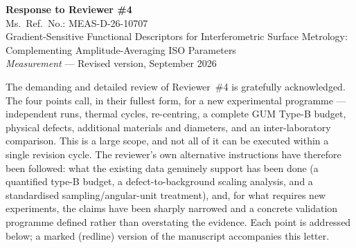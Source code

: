\documentclass[11pt,a4paper]{article}
\begin{document}
\begin{center}
{\Large\bfseries Response to Reviewer \#4}\\[0.4em]
{\large Ms.\ Ref.\ No.: MEAS-D-26-10707}\\[0.3em]
Gradient-Sensitive Functional Descriptors for Interferometric Surface Metrology:\\
Complementing Amplitude-Averaging ISO Parameters\\[0.3em]
\textit{Measurement} --- Revised version, September 2026
\end{center}

\bigskip

The demanding and detailed review of Reviewer~\#4 is gratefully acknowledged. The four points call, in their fullest form, for a new experimental programme --- independent runs, thermal cycles, re-centring, a complete GUM Type-B budget, physical defects, additional materials and diameters, and an inter-laboratory comparison. This is a large scope, and not all of it can be executed within a single revision cycle. The reviewer's own alternative instructions have therefore been followed: what the existing data genuinely support has been done (a quantified type-B budget, a defect-to-background scaling analysis, and a standardised sampling/angular-unit treatment), and, for what requires new experiments, the claims have been sharply narrowed and a concrete validation programme defined rather than overstating the evidence. Each point is addressed below; a marked (redline) version of the manuscript accompanies this letter.
\end{document}

